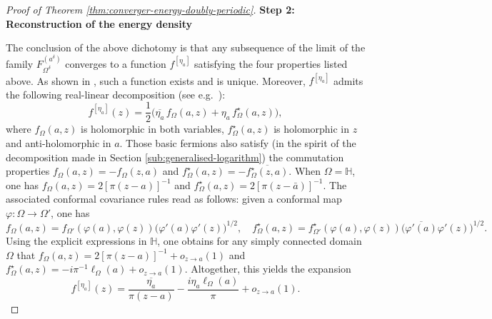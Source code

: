 \documentclass[reqno]{amsart}
\numberwithin{equation}{section}
\theoremstyle{definition}
\theoremstyle{remark}
\begin{document}
\begin{proof}[Proof of Theorem \ref{thm:converger-energy-doubly-periodic}]
\textbf{Step 2: Reconstruction of the energy density}

The conclusion of the above dichotomy is that any subsequence of the limit of the family $F^{(a^\delta)}_{\Omega^\delta}$ converges to a function $f^{[\eta_a]}$ satisfying the four properties listed above. As shown in \cite[Definition~3.12]{CHI-mixed}, such a function exists and is unique. Moreover, $f^{[\eta_a]}$ admits the following real-linear decomposition (see e.g.\ \cite[Lemma~3.17]{CHI-mixed}):
\begin{equation}
	f^{[\eta_a]}(z) = \frac{1}{2}\big(\overline{\eta_a}\, f_\Omega(a,z) + \eta_a\, f^\star_\Omega(a,z)\big),
\end{equation}
where $f_\Omega(a,z)$ is holomorphic in both variables, $f^\star_\Omega(a,z)$ is holomorphic in $z$ and anti-holomorphic in $a$. Those basic fermions also satisfy (in the  spirit of the decomposition made in Section \ref{sub:generalised-logarithm}) the commutation properties  $f_\Omega(a,z) = -f_\Omega(z,a)$ and $f^\star_\Omega(a,z) = -\overline{f^\star_\Omega(z,a)}$. When $\Omega = \mathbb{H}$, one has $f_\Omega(a,z) = 2[\pi(z-a)]^{-1}$ and $f^\star_\Omega(a,z) = 2[\pi(z-\bar{a})]^{-1}$. The associated conformal covariance rules read as follows: given a conformal map $\varphi : \Omega \to \Omega'$, one has
\[
f_\Omega(a,z) = f_{\Omega'}(\varphi(a),\varphi(z))\big(\varphi'(a)\varphi'(z)\big)^{1/2}, 
\quad
f^\star_\Omega(a,z) = f^\star_{\Omega'}(\varphi(a),\varphi(z))\big(\overline{\varphi'(a)}\varphi'(z)\big)^{1/2}.
\]
Using the explicit expressions in $\mathbb{H}$, one obtains for any simply connected domain $\Omega$ that $f_\Omega(a,z) = 2[\pi(z-a)]^{-1} + o_{z \to a}(1)$ and $f^\star_\Omega(a,z) = -i\pi^{-1}\ell_\Omega(a) + o_{z \to a}(1)$. Altogether, this yields the expansion
\begin{equation}\label{eq:expansion-hyperbolic-metric}
	f^{[\eta_a]}(z) = \frac{\overline{\eta_a}}{\pi(z-a)} - \frac{i\eta_a \ell_\Omega(a)}{\pi} + o_{z \to a}(1).
\end{equation}


\end{proof}
\end{document}
